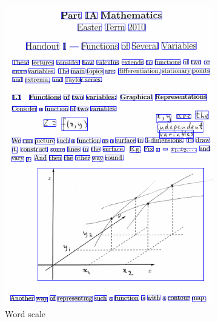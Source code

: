 \begin{figure}[!htb]
  \centering
  \begin{subfigure}{.45\textwidth}
    \includegraphics[width=\textwidth]{pla-word.png}
    \caption{Word scale}
  \end{subfigure}%
  \qquad
  \begin{subfigure}{.45\textwidth}

\end{subfigure}
\end{figure}
